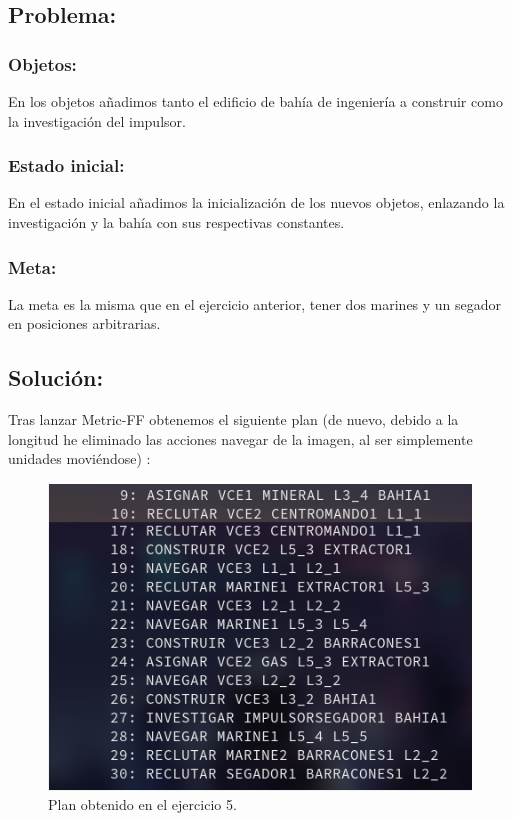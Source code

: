 \documentclass[10pt, spanish]{article}
\begin{document}
\subsection{Problema:}

\subsubsection{Objetos:}

En los objetos añadimos tanto el edificio de bahía de ingeniería a construir como la investigación del impulsor.

\subsubsection{Estado inicial:}

En el estado inicial añadimos la inicialización de los nuevos objetos, enlazando la investigación y la bahía con sus respectivas constantes.

\subsubsection{Meta:}

La meta es la misma que en el ejercicio anterior, tener dos marines y un segador en posiciones arbitrarias.

\subsection{Solución:}

Tras lanzar Metric-FF obtenemos el siguiente plan (de nuevo, debido a la longitud he eliminado las acciones navegar de la imagen, al ser simplemente unidades moviéndose)  :



\begin{figure}[H]
	\centering
	\includegraphics[scale=0.4]{plan5.png}
	\caption{Plan obtenido en el ejercicio 5.}
	\label{plan5}
\end{figure}
\end{document}

